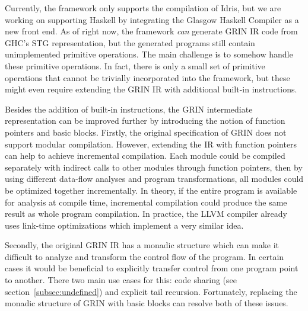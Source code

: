 \documentclass[main.tex]{subfiles}
\begin{document}
	
	Currently, the framework only supports the compilation of Idris, but we are working on supporting Haskell by integrating the Glasgow Haskell Compiler as a new front end. As of right now, the framework \emph{can} generate GRIN IR code from GHC's STG representation, but the generated programs still contain unimplemented primitive operations. The main challenge is to somehow handle these primitive operations. In fact, there is only a small set of primitive operations that cannot be trivially incorporated into the framework, but these might even require extending the GRIN IR with additional built-in instructions.
	
	Besides the addition of built-in instructions, the GRIN intermediate representation can be improved further by introducing the notion of function pointers and basic blocks. Firstly, the original specification of GRIN does not support modular compilation. However, extending the IR with function pointers can help to achieve incremental compilation. Each module could be compiled separately with indirect calls to other modules through function pointers, then by using different data-flow analyses and program transformations, all modules could be optimized together incrementally. In theory, if the entire program is available for analysis at compile time, incremental compilation could produce the same result as whole program compilation. In practice, the LLVM compiler already uses link-time optimizations which implement a very similar idea.
	
	Secondly, the original GRIN IR has a monadic structure which can make it difficult to analyze and transform the control flow of the program. In certain cases it would be beneficial to explicitly transfer control from one program point to another. There two main use cases for this: code sharing (see section~\ref{subsec:undefined}) and explicit tail recursion. Fortunately, replacing the monadic structure of GRIN with basic blocks can resolve both of these issues.
	
\end{document}
